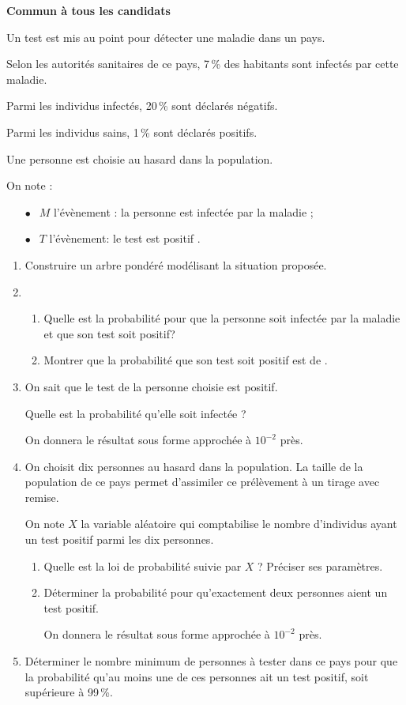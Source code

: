 
\textbf{Commun à tous les candidats}

\medskip

Un test est mis au point pour détecter une maladie dans un pays.

Selon les autorités sanitaires de ce pays, 7\,\% des habitants sont infectés par cette maladie. 

Parmi les individus infectés, 20\,\% sont déclarés négatifs.

Parmi les individus sains, 1\,\% sont déclarés positifs.

Une personne est choisie au hasard dans la population.

On note :

\setlength\parindent{9mm}
\begin{itemize}
\item[$\bullet~~$]$M$ l'évènement : \og la personne est infectée par la maladie\fg{} ;
\item[$\bullet~~$]$T$ l'évènement: \og le test est positif \fg.
\end{itemize}
\setlength\parindent{0mm}

\medskip

\begin{enumerate}
\item Construire un arbre pondéré modélisant la situation proposée.
\item 
	\begin{enumerate}
		\item Quelle est la probabilité pour que la personne soit infectée par la maladie et que son test soit positif?
		\item Montrer que la probabilité que son test soit positif est de .
	\end{enumerate}
\item On sait que le test de la personne choisie est positif. 

Quelle est la probabilité qu'elle soit infectée ?

On donnera le résultat sous forme approchée à $10^{-2}$ près.
\item On choisit dix personnes au hasard dans la population. La taille de la population de ce pays permet d'assimiler ce prélèvement à un tirage avec remise.

On note $X$ la variable aléatoire qui comptabilise le nombre d'individus ayant un test positif parmi les dix personnes.
	\begin{enumerate}
		\item Quelle est la loi de probabilité suivie par $X$ ? Préciser ses paramètres.
		\item Déterminer la probabilité pour qu'exactement deux personnes aient un test positif.

On donnera le résultat sous forme approchée à $10^{-2}$ près.
	\end{enumerate}
\item Déterminer le nombre minimum de personnes à tester dans ce pays pour que la probabilité qu'au moins une de ces personnes ait un test positif, soit supérieure à 99\,\%.
\end{enumerate}

\bigskip

